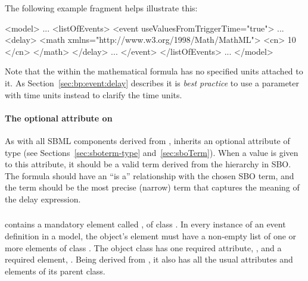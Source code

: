 The following \Event example fragment helps illustrate this:
\label{sec:event:delay:example}

\begin{example}
<model>
    ...
    <listOfEvents>
        <event useValuesFromTriggerTime="true">
            ...
            <delay>
                <math xmlns="http://www.w3.org/1998/Math/MathML">
                    <cn> 10 </cn>
                </math>
            </delay>
            ...
        </event>
    </listOfEvents>
    ...
</model>
\end{example}

Note that the  within the mathematical formula has
no specified units attached to it. As Section~\ref{sec:bp:event:delay} describes 
it is \emph{best practice} to use a parameter with time units instead to clarify 
the time units. 

\paragraph{The optional  attribute on }
\label{sec:delay-sboterm}

As with all SBML components derived from \SBase, \Delay inherits
an optional  attribute of type  (see
Sections~\ref{sec:sboterm-type} and~\ref{sec:sboTerm}).  When a
value is given to this attribute, it should be a valid term derived from
the \sbomathformula hierarchy in SBO.  The \Delay formula should
have an ``is a'' relationship with the chosen SBO term, and the
term should be the most precise (narrow) term that captures the
meaning of the delay expression.



\subsubsection{}
\label{sec:eventassignment}
\label{sec:listofeventassignments}

\Event contains a mandatory element called
, of class \ListOfEventAssignments.
In every instance of an event definition in a model, the object's
 element must have a non-empty list
of one or more  elements of class
\EventAssignment.  The object class \EventAssignment has one
required attribute, , and a required element,
.  Being derived from \SBase, it also has all the
usual attributes and elements of its parent class.

